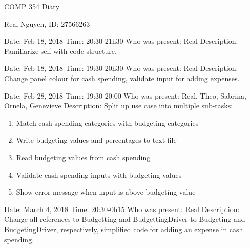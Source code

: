 \documentclass{article}
\begin{document}
 
\begin{center}
    COMP 354 Diary
\end{center}
 
\begin{center}
    Real Nguyen, ID: 27566263
\end{center}
 
\begin{flushleft}
Date: Feb 18, 2018 \newline
Time: 20:30-21h30 \newline
Who was present: Real\newline
Description: Familiarize self with code structure.\newline
\end{flushleft}
 
\begin{flushleft}
Date: Feb 18, 2018 \newline
Time: 19:30-20h30 \newline
Who was present: Real\newline
Description: Change panel colour for cash spending, validate input for adding expenses.\newline
\end{flushleft}
 
\begin{flushleft}
Date: Feb 28, 2018 \newline
Time: 19:30-20:00 \newline
Who was present: Real, Theo, Sabrina, Ornela, Genevieve\newline
Description: Split up use case into multiple sub-tasks:
\begin{enumerate}
  \item Match cash spending categories with budgeting categories
  \item Write budgeting values and percentages to text file
  \item Read budgeting values from cash spending
  \item Validate cash spending inputs with budgeting values
  \item Show error message when input is above budgeting value
\end{enumerate}
\end{flushleft}

\begin{flushleft}
Date: March 4, 2018 \newline
Time: 20:30-0h15 \newline
Who was present: Real\newline
Description: Change all references to Budgetting and BudgettingDriver to Budgeting and BudgetingDriver, respectively, simplified code for adding an expense in cash spending.\newline
\end{flushleft}
 
\end{document}
